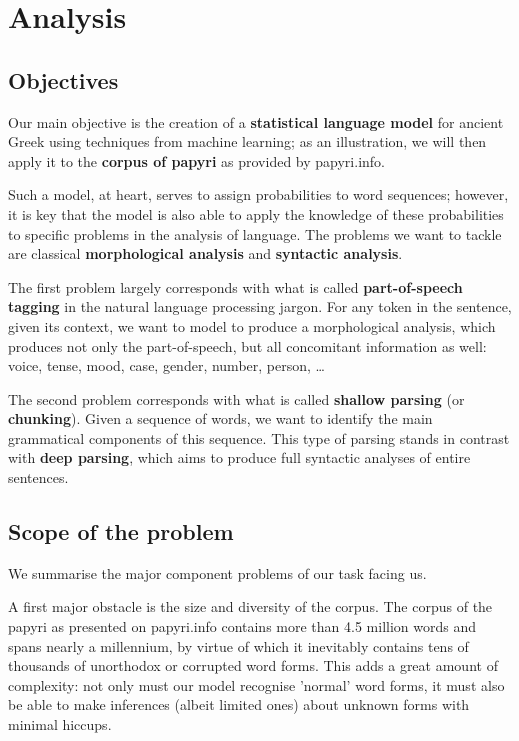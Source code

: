 
\chapter{Analysis}
\label{chp:analysis}

\section{Objectives}
Our main objective is the creation of a \textbf{statistical language
model} for ancient Greek using techniques from machine learning; as an
illustration, we will then apply it to the \textbf{corpus of papyri}
as provided by papyri.info.

Such a model, at heart, serves to assign probabilities to word
sequences; however, it is key that the model is also able to apply the
knowledge of these probabilities to specific problems in the analysis
of language. The problems we want to tackle are classical
\textbf{morphological analysis} and \textbf{syntactic analysis}.

The first problem largely corresponds with what is called
\textbf{part-of-speech tagging} in the natural language processing
jargon. For any token in the sentence, given its context, we want to
model to produce a morphological analysis, which produces not only the
part-of-speech, but all concomitant information as well: voice, tense,
mood, case, gender, number, person, \ldots

The second problem corresponds with what is called \textbf{shallow
parsing} (or \textbf{chunking}). Given a sequence of words, we want to
identify the main grammatical components of this sequence.  This type
of parsing stands in contrast with \textbf{deep parsing}, which aims
to produce full syntactic analyses of entire sentences.

\section{Scope of the problem}
We summarise the major component problems of our task facing us.

A first major obstacle is the size and diversity of the corpus. The
corpus of the papyri as presented on papyri.info contains more than
4.5 million words and spans nearly a millennium, by virtue of which it
inevitably contains tens of thousands of unorthodox or corrupted word
forms.  This adds a great amount of complexity: not only must our
model recognise 'normal' word forms, it must also be able to make
inferences (albeit limited ones) about unknown forms with minimal hiccups.

